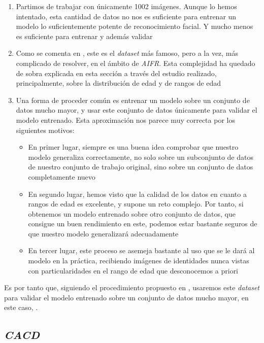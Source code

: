 \begin{enumerate}
    \item Partimos de trabajar con únicamente 1002 imágenes. Aunque lo hemos intentado, esta cantidad de datos no nos es suficiente para entrenar un modelo lo suficientemente potente de reconocimiento facial. Y mucho menos es suficiente para entrenar y además validar
    \item Como se comenta en \cite{informatica:best_fgnet_model}, este es el \textit{dataset} más famoso, pero a la vez, más complicado de resolver, en el ámbito de \textit{AIFR}. Esta complejidad ha quedado de sobra explicada en esta sección a través del estudio realizado, principalmente, sobre la distribución de edad y de rangos de edad
    \item Una forma de proceder común \cite{informatica:best_fgnet_model} es entrenar un modelo sobre un conjunto de datos mucho mayor, y usar este conjunto de datos únicamente para validar el modelo entrenado. Esta aproximación nos parece muy correcta por los siguientes motivos:
        \begin{itemize}
            \item En primer lugar, siempre es una buena idea comprobar que nuestro modelo generaliza correctamente, no solo sobre un subconjunto de datos de nuestro conjunto de trabajo original, sino sobre un conjunto de datos completamente nuevo
            \item En segundo lugar, hemos visto que la calidad de los datos en cuanto a rangos de edad es excelente, y supone un reto complejo. Por tanto, si obtenemos un modelo entrenado sobre otro conjunto de datos, que consigue un buen rendimiento en este, podemos estar bastante seguros de que nuestro modelo generalizará adecuadamente
            \item En tercer lugar, este proceso se asemeja bastante al uso que se le dará al modelo en la práctica, recibiendo imágenes de identidades nunca vistas con particularidades en el rango de edad que desconocemos a priori
        \end{itemize}
\end{enumerate}

Es por tanto que, siguiendo el procedimiento propuesto en \cite{informatica:best_fgnet_model}, usaremos este \textit{dataset} para validar el modelo entrenado sobre un conjunto de datos mucho mayor, en este caso, .

\subsection{\textit{CACD}} \label{isec:dataset_cacd}

